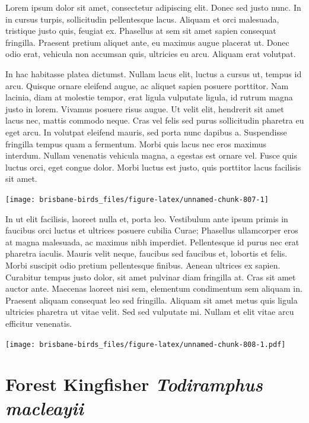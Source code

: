 \documentclass[]{book}
\let\origfigure\figure
\let\endorigfigure\endfigure
\renewenvironment{figure}[1][2] {
  \expandafter\origfigure\expandafter[H]
} {
  \endorigfigure
}
\begin{document}
Lorem ipsum dolor sit amet, consectetur adipiscing elit. Donec sed justo
nunc. In in cursus turpis, sollicitudin pellentesque lacus. Aliquam et
orci malesuada, tristique justo quis, feugiat ex. Phasellus at sem sit
amet sapien consequat fringilla. Praesent pretium aliquet ante, eu
maximus augue placerat ut. Donec odio erat, vehicula non accumsan quis,
ultricies eu arcu. Aliquam erat volutpat.

In hac habitasse platea dictumst. Nullam lacus elit, luctus a cursus ut,
tempus id arcu. Quisque ornare eleifend augue, ac aliquet sapien posuere
porttitor. Nam lacinia, diam at molestie tempor, erat ligula vulputate
ligula, id rutrum magna justo in lorem. Vivamus posuere risus augue. Ut
velit elit, hendrerit sit amet lacus nec, mattis commodo neque. Cras vel
felis sed purus sollicitudin pharetra eu eget arcu. In volutpat eleifend
mauris, sed porta nunc dapibus a. Suspendisse fringilla tempus quam a
fermentum. Morbi quis lacus nec eros maximus interdum. Nullam venenatis
vehicula magna, a egestas est ornare vel. Fusce quis luctus orci, eget
congue dolor. Morbi luctus est justo, quis porttitor lacus facilisis sit
amet.

\begin{figure}
\texttt{[image: brisbane-birds\_files/figure-latex/unnamed-chunk-807-1]} \caption{insert figure caption}\label{fig:unnamed-chunk-807}
\end{figure}

In ut elit facilisis, laoreet nulla et, porta leo. Vestibulum ante ipsum
primis in faucibus orci luctus et ultrices posuere cubilia Curae;
Phasellus ullamcorper eros at magna malesuada, ac maximus nibh
imperdiet. Pellentesque id purus nec erat pharetra iaculis. Mauris velit
neque, faucibus sed faucibus et, lobortis et felis. Morbi suscipit odio
pretium pellentesque finibus. Aenean ultrices ex sapien. Curabitur
tempus justo dolor, sit amet pulvinar diam fringilla at. Cras sit amet
auctor ante. Maecenas laoreet nisi sem, elementum condimentum sem
aliquam in. Praesent aliquam consequat leo sed fringilla. Aliquam sit
amet metus quis ligula ultricies pharetra ut vitae velit. Sed sed
vulputate mi. Nullam et elit vitae arcu efficitur venenatis.

\begin{figure}
\centering
\texttt{[image: brisbane-birds\_files/figure-latex/unnamed-chunk-808-1.pdf]}
\caption{\label{fig:unnamed-chunk-808}insert figure caption}
\end{figure}

\section{\texorpdfstring{Forest Kingfisher \emph{Todiramphus
macleayii}}{Forest Kingfisher Todiramphus macleayii}}\label{forest-kingfisher-todiramphus-macleayii}
\end{document}
